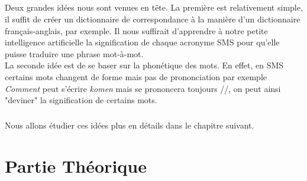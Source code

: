 \documentclass[11pt]{report}
\begin{document}
	\paragraph{}
	Deux grandes idées nous sont venues en tête. La première est relativement simple, il suffit de créer un dictionnaire de correspondance à la manière d'un dictionnaire français-anglais, par exemple. Il nous suffirait d'apprendre à notre petite intelligence artificielle la signification de chaque acronyme SMS pour qu'elle puisse traduire une phrase mot-à-mot.\\
	La seconde idée est de se baser sur la phonétique des mots. En effet, en SMS certains mots changent de forme mais pas de prononciation par exemple {\em Comment} peut s'écrire {\em komen} mais se prononcera toujours //, on peut ainsi "deviner" la signification de certains mots.
	\paragraph{}
	Nous allons étudier ces idées plus en détails dans le chapitre suivant.

\chapter{Partie Théorique}
\end{document}
